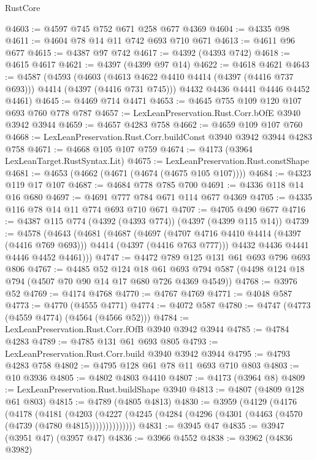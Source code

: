 \begin{lexlean}{RustCore}
\begin{coremodule}
@4603 := @4597 @745 @752 @671 @258 @677 @4369
@4604 := @4335 @98
@4611 := @4604 @78 @14 @11 @742 @693 @710 @671
@4613 := @4611 @96 @677
@4615 := @4387 @97 @742
@4617 := @4392 (@4393 @742)
@4618 := @4615 @4617
@4621 := @4397 (@4399 @97 @14)
@4622 := @4618 @4621
@4643 := @4587
    (@4593
      (@4603 (@4613 @4622 @4410 @4414 (@4397 (@4416 @737 @693))) @4414 (@4397 (@4416 @731 @745)))
      @4432
      @4436
      @4441
      @4446
      @4452
      @4461)
@4645 := @4469 @714 @4471
@4653 := @4645 @755 @109 @120 @107 @693 @760 @778 @787
@4657 := LexLeanPreservation.Rust.Corr.bOfE @3940 @3942 @3944
@4659 := @4657 @4283 @758
@4662 := @4659 @109 @107 @760
@4668 := LexLeanPreservation.Rust.Corr.buildConst @3940 @3942 @3944 @4283 @758
@4671 := @4668 @105 @107 @759
@4674 := @4173 (@3964 LexLeanTarget.RustSyntax.Lit)
@4675 := LexLeanPreservation.Rust.constShape
@4681 := @4653 (@4662 (@4671 (@4674 (@4675 @105 @107))))
@4684 := @4323 @119 @17 @107
@4687 := @4684 @778 @785 @700
@4691 := @4336 @118 @14 @16 @680
@4697 := @4691 @777 @784 @671 @114 @677 @4369
@4705 := @4335 @116 @78 @14 @11 @774 @693 @710 @671
@4707 := @4705 @490 @677
@4716 := @4387 @115 @774 (@4392 (@4393 @774)) (@4397 (@4399 @115 @14))
@4739 := @4578
    (@4643
      (@4681
        (@4687
          (@4697
            (@4707 @4716 @4410 @4414 (@4397 (@4416 @769 @693)))
            @4414
            (@4397 (@4416 @763 @777)))
          @4432
          @4436
          @4441
          @4446
          @4452
          @4461)))
@4747 := @4472 @789 @125 @131 @61 @693 @796 @693 @806
@4767 := @4485
    @52
    @124
    @18
    @61
    @693
    @794
    @587
    (@4498 @124 @18 @794 (@4507 @70 @90 @14 @17 @680 @726 @4369 @4549))
@4768 := @3976 @52
@4769 := @4174 @4768
@4770 := @4767 @4769
@4771 := @4048 @587
@4773 := @4770 (@4555 @4771)
@4774 := @4072 @587
@4780 := @4747 (@4773 (@4559 @4774) (@4564 (@4566 @52)))
@4784 := LexLeanPreservation.Rust.Corr.fOfB @3940 @3942 @3944
@4785 := @4784 @4283
@4789 := @4785 @131 @61 @693 @805
@4793 := LexLeanPreservation.Rust.Corr.build @3940 @3942 @3944
@4795 := @4793 @4283 @758
@4802 := @4795 @128 @61 @78 @11 @693 @710 @803
@4803 := @10 @3936
@4805 := @4802 @4803 @4410
@4807 := @4173 (@3964 @8)
@4809 := LexLeanPreservation.Rust.buildShape @3940
@4813 := @4807 (@4809 @128 @61 @803)
@4815 := @4789 (@4805 @4813)
@4830 := @3959
    (@4129
      (@4176
        (@4178
          (@4181
            (@4203
              (@4227 (@4245 (@4284 (@4296 (@4301 (@4463 (@4570 (@4739 (@4780 @4815))))))))))))))
@4831 := @3945 @47
@4835 := @3947 (@3951 @47) (@3957 @47)
@4836 := @3966 @4552
@4838 := @3962 (@4836 @3982)

\end{coremodule}
\end{lexlean}
